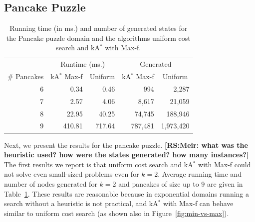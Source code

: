 \documentclass{aicom2e}
\newcommand{\kastar}{kA$^*$}
\newcommand{\maxf}{Max-f}
\newcommand{\roni}[1]{\textbf{[RS:#1]}}
\begin{document}
\subsection{Pancake Puzzle}

\begin{table}[]
	\centering
	\begin{tabular}{r|rr|rr}
		\multicolumn{1}{l|}{}            & \multicolumn{2}{c|}{Runtime (ms.)}                                       & \multicolumn{2}{c}{Generated}                                           \\
		\multicolumn{1}{c|}{\# Pancakes} & \multicolumn{1}{c}{\kastar{} \maxf{}} & \multicolumn{1}{c|}{Uniform} & \multicolumn{1}{c}{\kastar{} \maxf{}} & \multicolumn{1}{c}{Uniform} \\ \hline
		6                               & 0.34                                      & 0.46                        & 994                                       & 2,287                       \\
		7                               & 2.57                                      & 4.06                        & 8,617                                     & 21,059                      \\
		8                               & 22.95                                     & 40.25                       & 74,745                                    & 188,946                     \\
		9                               & 410.81                                    & 717.64                      & 787,481                                   & 1,973,420                  
	\end{tabular}
	\caption{Running time (in ms.) and number of generated states for the Pancake puzzle domain and the algorithms uniform cost search and \kastar{} with \maxf{}.}
\label{tab:pancake-max-uniform}
\end{table}

Next, we present the results for the pancake puzzle. 
\roni{Meir: what was the heuristic used? how were the states generated? how many instances?}
The first results we report is that uniform cost search and \kastar{} with \maxf{} 
could not solve even small-sized problems even for $k=2$. Average running time and number of nodes generated  for $k=2$ and pancakes of size up to 9 are given in Table~\ref{tab:pancake-max-uniform}. These results are reasonable because in exponential domains running a search without a heuristic is not practical, and \kastar{} with \maxf{} can behave similar to uniform cost search (as shown also in Figure~\ref{fig:min-vs-max}). 
\end{document}

